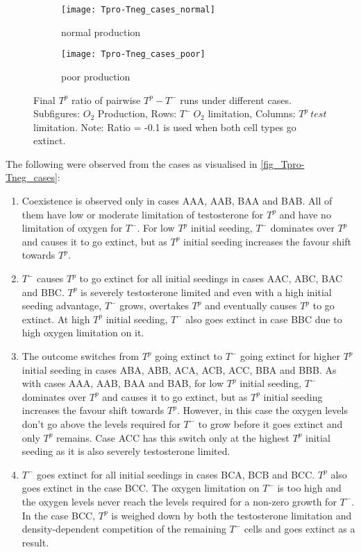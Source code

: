 \begin{figure}[h!]
  \centering
  \begin{subfigure}[b]{\textwidth}
    \centering
    \texttt{[image: Tpro-Tneg\_cases\_normal]}
    \caption{normal production}
    \label{fig_Tpro-Tneg_cases_normal}
  \end{subfigure}
  \begin{subfigure}[b]{\textwidth}
    \centering
    \texttt{[image: Tpro-Tneg\_cases\_poor]}
    \caption{poor production}
    \label{fig_Tpro-Tneg_cases_poor}
  \end{subfigure}
  \caption[Final $T^p$ ratio of pairwise $T^p - T^-$ runs under different cases]{Final $T^p$ ratio of pairwise $T^p - T^-$ runs under different cases. Subfigures: $O_2$ Production, Rows: $T^-\ O_2$ limitation, Columns: $T^p\ test$ limitation. Note: Ratio = -0.1 is used when both cell types go extinct.}
  \label{fig_Tpro-Tneg_cases}
\end{figure}

\newpage
The following were observed from the cases as visualised in \autoref{fig_Tpro-Tneg_cases}:
\begin{enumerate}
  \item Coexistence is observed only in cases AAA, AAB, BAA and BAB. All of them have low or moderate limitation of testosterone for $T^p$ and have no limitation of oxygen for $T^-$. For low $T^p$ initial seeding, $T^-$ dominates over $T^p$ and causes it to go extinct, but as $T^p$ initial seeding increases the favour shift towards $T^p$.
  \item $T^-$ causes $T^p$ to go extinct for all initial seedings in cases AAC, ABC, BAC and BBC. $T^p$ is severely testosterone limited and even with a high initial seeding advantage, $T^-$ grows, overtakes $T^p$ and eventually causes $T^p$ to go extinct. At high $T^p$ initial seeding, $T^-$ also goes extinct in case BBC due to high oxygen limitation on it.
  \item The outcome switches from $T^p$ going extinct to $T^-$ going extinct for higher $T^p$ initial seeding in cases ABA, ABB, ACA, ACB, ACC, BBA and BBB. As with cases AAA, AAB, BAA and BAB, for low $T^p$ initial seeding, $T^-$ dominates over $T^p$ and causes it to go extinct, but as $T^p$ initial seeding increases the favour shift towards $T^p$. However, in this case the oxygen levels don't go above the levels required for $T^-$ to grow before it goes extinct and only $T^p$ remains. Case ACC has this switch only at the highest $T^p$ initial seeding as it is also severely testosterone limited.
  \item $T^-$ goes extinct for all initial seedings in cases BCA, BCB and BCC. $T^p$ also goes extinct in the case BCC. The oxygen limitation on $T^-$ is too high and the oxygen levels never reach the levels required for a non-zero growth for $T^-$. In the case BCC, $T^p$ is weighed down by both the testosterone limitation and density-dependent competition of the remaining $T^-$ cells and goes extinct as a result.
\end{enumerate}

